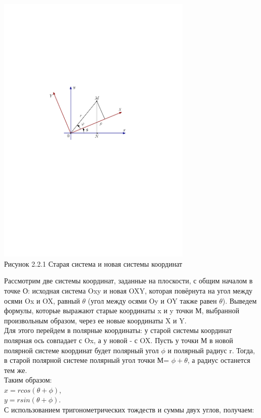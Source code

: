 \begin{center}
    \includegraphics[width=0.7\textwidth]{Lab3/pictures/rotation.pdf}\\
    Рисунок 2.2.1 Старая система и новая системы координат\\
\end{center}
\hspace*{\parindent} Рассмотрим две системы координат, заданные на плоскости, с общим началом в точке О: исходная система Oxy и новая OXY, которая повёрнута на угол между осями Ox и OX, равный $\theta$ (угол между осями Oy и OY также равен $\theta$). Выведем формулы, которые выражают старые координаты x и y точки М, выбранной произвольным образом, через ее новые координаты X и Y.\\
Для этого перейдем в полярные координаты: у старой системы координат полярная ось совпадает с Ox, а у новой - с OX. Пусть у точки М в новой полярной системе координат будет полярный угол $\phi$ и полярный радиус r. Тогда, в старой полярной системе полярный угол точки М= $\phi+\theta$, а радиус останется тем же.\\
Таким образом: \\
$x=rcos(\theta+\phi)$,\\
$y=rsin(\theta+\phi)$.\\
С использованием тригонометрических тождеств и суммы двух углов, получаем:\\
